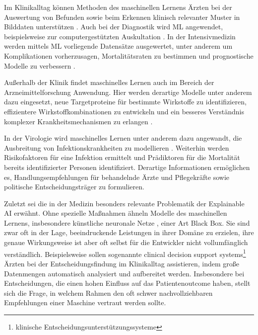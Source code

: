 Im Klinikalltag können Methoden des maschinellen Lernens Ärzten bei der Auswertung von Befunden sowie beim Erkennen klinisch relevanter Muster in Bilddaten unterstützen \citep{shahArtificialIntelligenceMachine2019}. Auch bei der Diagnostik wird ML angewendet, beispielsweise zur computergestützten Auskultation \citep{reedHeartSoundAnalysis2004}. In der Intensivmedizin werden mittels ML vorliegende Datensätze ausgewertet, unter anderem um Komplikationen vorherzusagen, Mortalitätsraten zu bestimmen und prognostische Modelle zu verbessern \citep{shillanUseMachineLearning2019, krishnanSupervisedLearningApproach2018}.

Außerhalb der Klinik findet maschinelles Lernen auch im Bereich der Arzneimittelforschung Anwendung. Hier werden derartige Modelle unter anderem dazu eingesetzt, neue Targetproteine für bestimmte Wirkstoffe zu identifizieren, effizientere Wirkstoffkombinationen zu entwickeln und ein besseres Verständnis komplexer Krankheitsmechanismen zu erlangen \citep{vamathevanApplicationsMachineLearning2019}.

In der Virologie wird maschinelles Lernen unter anderem dazu angewandt, die Ausbreitung von Infektionskrankheiten zu modellieren \citep{9121027}. Weiterhin werden Risikofaktoren für eine Infektion ermittelt und Prädiktoren für die Mortalität bereits identifizierter Personen identifiziert. Derartige Informationen ermöglichen es, Handlungsempfehlungen für behandelnde Ärzte und Pflegekräfte \citep{colubriMachineLearningPrognosticModels2019} sowie politische Entscheidungsträger \citep{satuMachineLearningBasedApproaches2020} zu formulieren.

Zuletzt sei die in der Medizin besonders relevante Problematik der Explainable AI erwähnt. Ohne spezielle Maßnahmen ähneln Modelle des maschinellen Lernens, insbesondere künstliche neuronale Netze , einer Art Black Box. Sie sind zwar oft in der Lage, beeindruckende Leistungen in ihrer Domäne zu erzielen, ihre genaue Wirkungsweise ist aber oft selbst für die Entwickler nicht vollumfänglich verständlich. Beispielsweise sollen sogenannte clinical decision support systems\footnote{klinische Entscheidungsunterstützungssysteme} Ärzten bei der Entscheidungsfindung im Klinikalltag assistieren, indem große Datenmengen automatisch analysiert und aufbereitet werden. Insbesondere bei Entscheidungen, die einen hohen Einfluss auf das Patientenoutcome haben, stellt sich die Frage, in welchem Rahmen den oft schwer nachvollziehbaren Empfehlungen einer Maschine vertraut werden sollte.